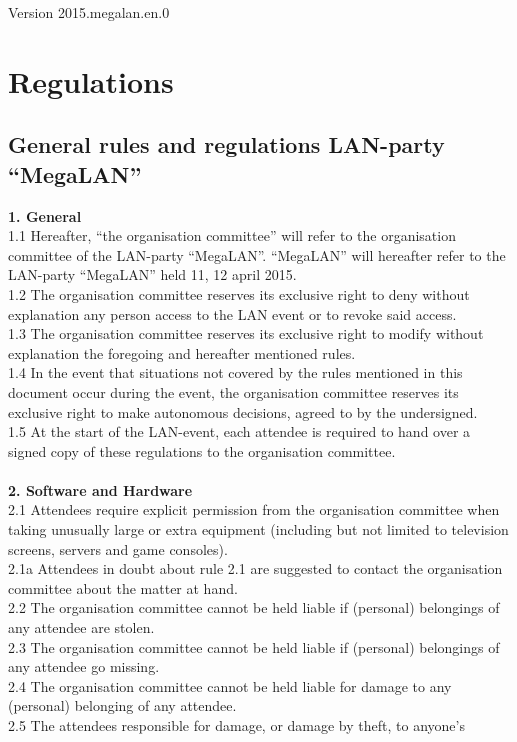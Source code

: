 \documentclass{article}
\begin{document}
Version 2015.megalan.en.0

\section{Regulations}
\subsection*{General rules and regulations LAN-party ``MegaLAN''}
\textbf{1. General}\\
1.1 Hereafter, ``the organisation committee'' will refer to the organisation 
committee of the LAN-party ``MegaLAN''. ``MegaLAN'' will 
hereafter refer to the LAN-party ``MegaLAN'' held 11, 12 april 2015.\\
1.2 The organisation committee reserves its exclusive right to deny without 
explanation any person access to the LAN event or to revoke said access.\\
1.3 The organisation committee reserves its exclusive right to modify without 
explanation the foregoing and hereafter mentioned rules.\\
1.4 In the event that situations not covered by the rules mentioned in this 
document occur during the event, the organisation committee reserves its 
exclusive right to make autonomous decisions, agreed to by the undersigned. \\
1.5 At the start of the LAN-event, each attendee is required to hand over a 
signed copy of these regulations to the organisation committee.\\
\\
\textbf{2. Software and Hardware}\\
2.1 Attendees require explicit permission from the organisation committee when 
taking unusually large or extra equipment (including but not limited to 
television screens, servers and game consoles). \\
2.1a Attendees in doubt about rule 2.1 are suggested to contact the organisation 
committee about the matter at hand. \\
2.2 The organisation committee cannot be held liable if (personal) belongings of 
any attendee are stolen.\\
2.3 The organisation committee cannot be held liable if (personal) belongings of 
any attendee go missing.\\
2.4 The organisation committee cannot be held liable for damage to any 
(personal) belonging of any attendee.\\
2.5 The attendees responsible for damage, or damage by theft, to anyone’s 
\end{document}
